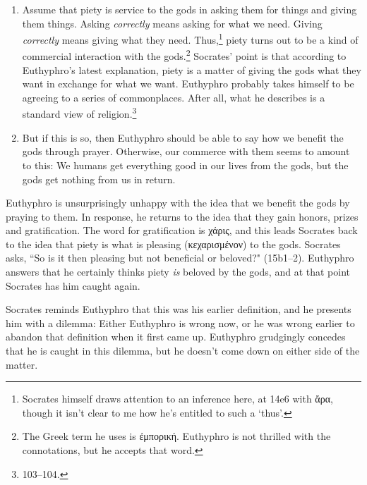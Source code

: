 \documentclass[11pt]{article}
\begin{document}
\begin{enumerate}

    \item Assume that piety is service to the gods in asking them for
        things and giving them things.  Asking \emph{correctly} means
        asking for what we need.  Giving \emph{correctly} means giving what
        they need.  Thus,\footnote{Socrates himself draws attention to an
        inference here, at 14e6 with {\g ἄρα}, though it isn't clear to
        me how he's entitled to such a `thus'.} piety turns out to be
        a kind of commercial interaction with the gods.\footnote{The Greek
        term he uses is {\g ἐμπορική}.  Euthyphro is not thrilled with
        the connotations, but he accepts that word.}  Socrates' point is
        that according to Euthyphro's latest explanation, piety is a matter
        of giving the gods what they want in exchange for what we want.
        Euthyphro probably takes himself to be agreeing to a series of
        commonplaces.  After all, what he describes is a standard
         view of religion.\footnote{\citet{bailly2003}
        103--104.}

    \item But if this is so, then Euthyphro should be able to say how we
        benefit the gods through prayer.  Otherwise, our commerce with them
        seems to amount to this: We humans get everything good in our lives
        from the gods, but the gods get nothing from us in return.

\end{enumerate}

Euthyphro is unsurprisingly unhappy with the idea that we benefit the gods
by praying to them.  In response, he returns to the idea that they gain
honors, prizes and gratification.  The word for gratification is {\g
χάρις}, and this leads Socrates back to the idea that piety is what is
pleasing ({\g κεχαρισμένον}) to the gods.  Socrates asks, ``So is it then
pleasing but not beneficial or beloved?" (15b1--2).  Euthyphro answers that
he certainly thinks piety \emph{is} beloved by the gods, and at that point
Socrates has him caught again.

Socrates reminds Euthyphro that this was his earlier definition, and he
presents him with a dilemma: Either Euthyphro is wrong now, or he was wrong
earlier to abandon that definition when it first came up.  Euthyphro
grudgingly concedes that he is caught in this dilemma, but he doesn't come
down on either side of the matter.
\end{document}
